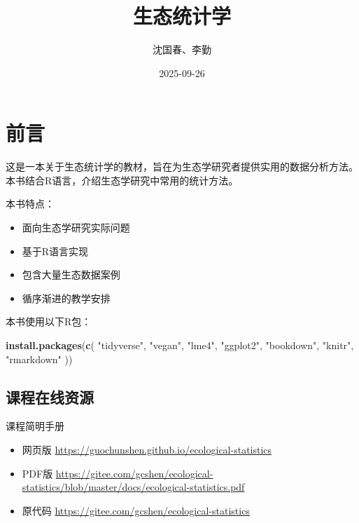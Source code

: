 \documentclass[
]{book}
\title{生态统计学}
\author{沈国春、李勤}
\date{2025-09-26}
\newenvironment{Shaded}{\begin{snugshade}}{\end{snugshade}}
\newcommand{\FunctionTok}[1]{\textcolor[rgb]{0.13,0.29,0.53}{\textbf{#1}}}
\newcommand{\NormalTok}[1]{#1}
\newcommand{\StringTok}[1]{\textcolor[rgb]{0.31,0.60,0.02}{#1}}
\providecommand{\tightlist}{%
  \setlength{\itemsep}{0pt}\setlength{\parskip}{0pt}}
\begin{document}
\maketitle

{
\setcounter{tocdepth}{1}
\tableofcontents
}
\hypertarget{ux524dux8a00}{%
\chapter*{前言}\label{ux524dux8a00}}

这是一本关于生态统计学的教材，旨在为生态学研究者提供实用的数据分析方法。本书结合R语言，介绍生态学研究中常用的统计方法。

本书特点：

\begin{itemize}
\tightlist
\item
  面向生态学研究实际问题
\item
  基于R语言实现
\item
  包含大量生态数据案例
\item
  循序渐进的教学安排
\end{itemize}

本书使用以下R包：

\begin{Shaded}
\begin{Highlighting}[]
\FunctionTok{install.packages}\NormalTok{(}\FunctionTok{c}\NormalTok{(}
  \StringTok{"tidyverse"}\NormalTok{, }\StringTok{"vegan"}\NormalTok{, }\StringTok{"lme4"}\NormalTok{, }\StringTok{"ggplot2"}\NormalTok{, }
  \StringTok{"bookdown"}\NormalTok{, }\StringTok{"knitr"}\NormalTok{, }\StringTok{"rmarkdown"}
\NormalTok{))}
\end{Highlighting}
\end{Shaded}

\hypertarget{ux8bfeux7a0bux5728ux7ebfux8d44ux6e90}{%
\section{课程在线资源}\label{ux8bfeux7a0bux5728ux7ebfux8d44ux6e90}}

课程简明手册

\begin{itemize}
\tightlist
\item
  网页版 \url{https://guochunshen.github.io/ecological-statistics}
\item
  PDF版 \url{https://gitee.com/gcshen/ecological-statistics/blob/master/docs/ecological-statistics.pdf}
\item
  原代码 \url{https://gitee.com/gcshen/ecological-statistics}
\end{itemize}
\end{document}
